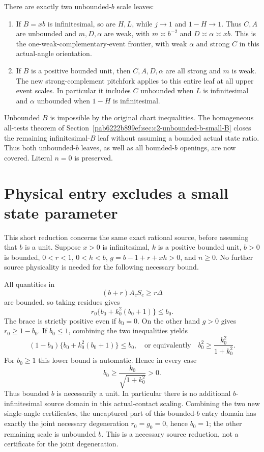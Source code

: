 There are exactly two unbounded-$b$ scale leaves:
\begin{enumerate}
\item If $B=xb$ is infinitesimal, so are $H,L$, while $j\to1$
and $1-H\to1$. Thus $C,A$ are unbounded and $m,D,\alpha$ are
weak, with $m\asymp b^{-2}$ and $D\asymp\alpha\asymp xb$.
This is the one-weak-complementary-event frontier, with weak
$\alpha$ and strong $C$ in this actual-angle orientation.
\item If $B$ is a positive bounded unit, then $C,A,D,\alpha$
are all strong and $m$ is weak. The new strong-complement pitchfork
applies to this entire leaf at all upper event scales. In particular
it includes $C$ unbounded when $L$ is infinitesimal and $\alpha$
unbounded when $1-H$ is infinitesimal.
\end{enumerate}
Unbounded $B$ is impossible by the original chart inequalities.
The homogeneous all-tests theorem of Section~\ref{pab6222b899ef:sec:c2-unbounded-b-small-B}
closes the remaining infinitesimal-$B$ leaf without assuming a bounded
actual state ratio. Thus both unbounded-$b$ leaves, as well as all
bounded-$b$ openings, are now covered. Literal $n=0$ is preserved.


\section{\texorpdfstring{Physical entry excludes a small state parameter}{Physical entry excludes a small state parameter}}
\label{component:p7294aae40ee2}

\label{p7294aae40ee2:sec:c2-bounded-state-entry}

This short reduction concerns the same exact rational source, before
assuming that $b$ is a unit.  Suppose $x>0$ is infinitesimal, $k$ is
a positive bounded unit, $b>0$ is bounded, $0<r<1$, $0<h<b$,
$g=b-1+r+xh>0$, and $n\geq0$.  No further source physicality is
needed for the following necessary bound.

All quantities in
\[
             (b+r)A_cS_c\geq r\Delta
\]
are bounded, so taking residues gives
\[
 r_0\{b_0+k_0^2(b_0+1)\}\leq b_0.
\]
The brace is strictly positive even if $b_0=0$.  On the other hand
$g>0$ gives $r_0\geq1-b_0$.  If $b_0\leq1$, combining the two
inequalities yields
\[
 (1-b_0)\{b_0+k_0^2(b_0+1)\}\leq b_0,
 \quad\text{or equivalently}\quad
              b_0^2\geq\frac{k_0^2}{1+k_0^2}.
\]
For $b_0\geq1$ this lower bound is automatic.  Hence in every case
\[
                b_0\geq\frac{k_0}{\sqrt{1+k_0^2}}>0.
\]
Thus bounded $b$ is necessarily a unit.  In particular there is no
additional $b$-infinitesimal source domain in this actual-contact
scaling.  Combining the two new single-angle certificates, the
uncaptured part of this bounded-$b$ entry domain has exactly the
joint necessary degeneration $r_0=g_0=0$, hence $b_0=1$; the other
remaining scale is unbounded $b$.  This is a necessary source
reduction, not a certificate for the joint degeneration.


